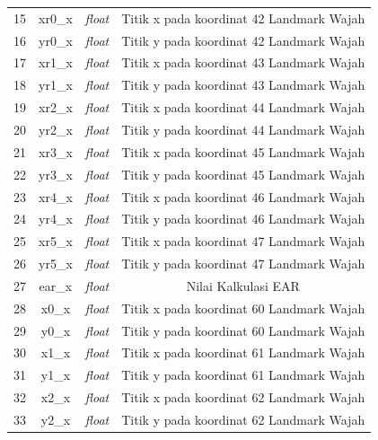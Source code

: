 \begin{longtable}{|c|c|c|c|}
  15          & xr0\_x              & \textit{float}     & Titik x pada koordinat 42 Landmark Wajah \\
  16          & yr0\_x              & \textit{float}     & Titik y pada koordinat 42 Landmark Wajah \\
  17          & xr1\_x              & \textit{float}     & Titik x pada koordinat 43 Landmark Wajah \\
  18          & yr1\_x              & \textit{float}     & Titik y pada koordinat 43 Landmark Wajah \\
  19          & xr2\_x              & \textit{float}     & Titik x pada koordinat 44 Landmark Wajah \\
  20          & yr2\_x              & \textit{float}     & Titik y pada koordinat 44 Landmark Wajah \\
  21          & xr3\_x              & \textit{float}     & Titik x pada koordinat 45 Landmark Wajah \\
  22          & yr3\_x              & \textit{float}     & Titik y pada koordinat 45 Landmark Wajah \\
  23          & xr4\_x              & \textit{float}     & Titik x pada koordinat 46 Landmark Wajah \\
  24          & yr4\_x              & \textit{float}     & Titik y pada koordinat 46 Landmark Wajah \\
  25          & xr5\_x              & \textit{float}     & Titik x pada koordinat 47 Landmark Wajah \\
  26          & yr5\_x              & \textit{float}     & Titik y pada koordinat 47 Landmark Wajah \\
  27          & ear\_x              & \textit{float}     & Nilai Kalkulasi EAR                      \\
  28          & x0\_x               & \textit{float}     & Titik x pada koordinat 60 Landmark Wajah \\
  29          & y0\_x               & \textit{float}     & Titik y pada koordinat 60 Landmark Wajah \\
  30          & x1\_x               & \textit{float}     & Titik x pada koordinat 61 Landmark Wajah \\
  31          & y1\_x               & \textit{float}     & Titik y pada koordinat 61 Landmark Wajah \\
  32          & x2\_x               & \textit{float}     & Titik x pada koordinat 62 Landmark Wajah \\
  33          & y2\_x               & \textit{float}     & Titik y pada koordinat 62 Landmark Wajah \\

\end{longtable}
